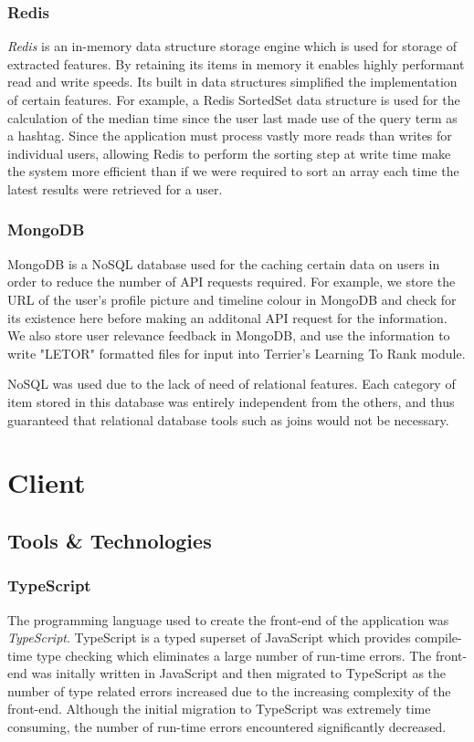 \documentclass{l4proj}
\begin{document}

        \subsubsection{Redis}
        \textit{Redis} is an in-memory data structure storage engine which is used for storage of extracted features. By retaining its items in memory it enables highly performant read and write speeds. Its built in data structures simplified the implementation of certain features. For example, a Redis SortedSet data structure is used for the calculation of the median time since the user last made use of the query term as a hashtag. Since the application must process vastly more reads than writes for individual users, allowing Redis to perform the sorting step at write time make the system more efficient than if we were required to sort an array each time the latest results were retrieved for a user.
        
         \subsubsection{MongoDB}
         MongoDB is a NoSQL database used for the caching certain data on users in order to reduce the number of API requests required. For example, we store the URL of the user's profile picture and timeline colour in MongoDB and check for its existence here before making an additonal API request for the information. We also store user relevance feedback in MongoDB, and use the information to write "LETOR" formatted files for input into Terrier's Learning To Rank module.
         
         NoSQL was used due to the lack of need of relational features. Each category of item stored in this database was entirely independent from the others, and thus guaranteed that relational database tools such as joins would not be necessary.

\section{Client}

    \subsection{Tools \& Technologies}
    
        \subsubsection{TypeScript}
        The programming language used to create the front-end of the application was \textit{TypeScript}. TypeScript is a typed superset of JavaScript which provides compile-time type checking which eliminates a large number of run-time errors. The front-end was initally written in JavaScript and then migrated to TypeScript as the number of type related errors increased due to the increasing complexity of the front-end. Although the initial migration to TypeScript was extremely time consuming, the number of run-time errors encountered significantly decreased.
    
\end{document}
